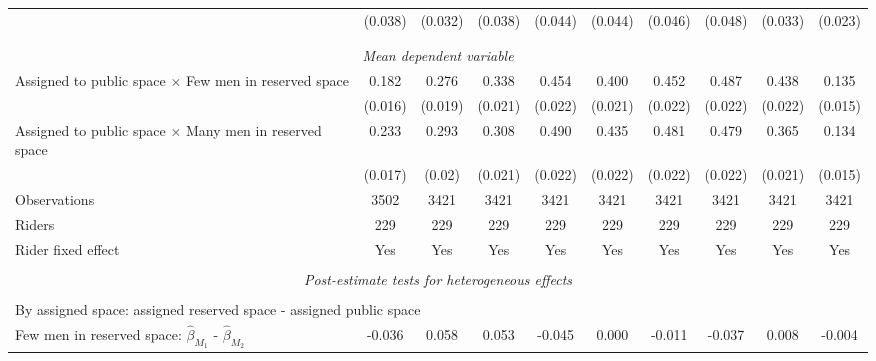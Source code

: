 \begin{tabular}{l*{9}{c}}
                    &     (0.038)         &     (0.032)         &     (0.038)         &     (0.044)         &     (0.044)         &     (0.046)         &     (0.048)         &     (0.033)         &     (0.023)         \\
\\[-1.8ex] \hline \\[-1.8ex]  
\multicolumn{10}{c}{\textit{Mean dependent variable}} \\ Assigned to public space $\times$ Few men in reserved space&       0.182         &       0.276         &       0.338         &       0.454         &       0.400         &       0.452         &       0.487         &       0.438         &       0.135         \\
\,                  &     (0.016)         &     (0.019)         &     (0.021)         &     (0.022)         &     (0.021)         &     (0.022)         &     (0.022)         &     (0.022)         &     (0.015)         \\
Assigned to public space $\times$ Many men in reserved space&       0.233         &       0.293         &       0.308         &       0.490         &       0.435         &       0.481         &       0.479         &       0.365         &       0.134         \\
\,                  &     (0.017)         &      (0.02)         &     (0.021)         &     (0.022)         &     (0.022)         &     (0.022)         &     (0.022)         &     (0.021)         &     (0.015)         \\
Observations        &        3502         &        3421         &        3421         &        3421         &        3421         &        3421         &        3421         &        3421         &        3421         \\
Riders              &         229         &         229         &         229         &         229         &         229         &         229         &         229         &         229         &         229         \\
Rider fixed effect  &         Yes         &         Yes         &         Yes         &         Yes         &         Yes         &         Yes         &         Yes         &         Yes         &         Yes         \\
\hline \\[-1ex]  \multicolumn{10}{c}{\textit{Post-estimate tests for heterogeneous effects}} \\\\[-1ex] \multicolumn{10}{l}{By assigned space: assigned reserved space - assigned public space} \\ \quad Few men in reserved space: $\hat\beta_{M_1}$ - $\hat\beta_{M_2}$&      -0.036         &       0.058         &       0.053         &      -0.045         &       0.000         &      -0.011         &      -0.037         &       0.008         &      -0.004         \\

\end{tabular}
